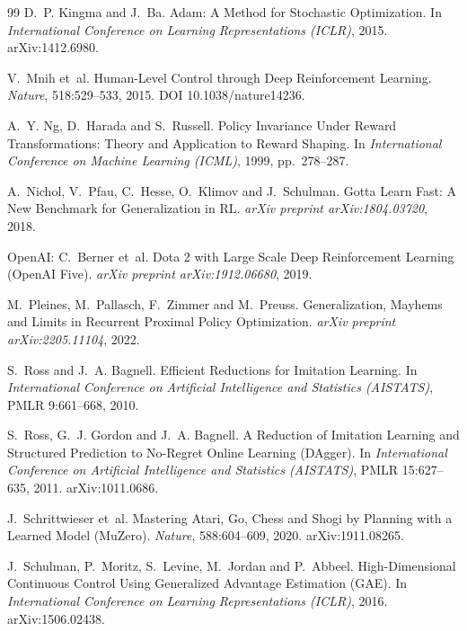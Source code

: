 \documentclass[11pt]{article}
\begin{document}
\begin{thebibliography}{99}
D.~P. Kingma and J.~Ba.
\newblock Adam: A Method for Stochastic Optimization.
\newblock In \emph{International Conference on Learning Representations (ICLR)}, 2015. arXiv:1412.6980.

V.~Mnih et~al.
\newblock Human-Level Control through Deep Reinforcement Learning.
\newblock \emph{Nature}, 518:529--533, 2015. DOI 10.1038/nature14236.

A.~Y. Ng, D.~Harada and S.~Russell.
\newblock Policy Invariance Under Reward Transformations: Theory and Application to Reward Shaping.
\newblock In \emph{International Conference on Machine Learning (ICML)}, 1999, pp.~278--287.

A.~Nichol, V.~Pfau, C.~Hesse, O.~Klimov and J.~Schulman.
\newblock Gotta Learn Fast: A New Benchmark for Generalization in RL.
\newblock \emph{arXiv preprint arXiv:1804.03720}, 2018.

OpenAI: C.~Berner et~al.
\newblock Dota 2 with Large Scale Deep Reinforcement Learning (OpenAI Five).
\newblock \emph{arXiv preprint arXiv:1912.06680}, 2019.

M.~Pleines, M.~Pallasch, F.~Zimmer and M.~Preuss.
\newblock Generalization, Mayhems and Limits in Recurrent Proximal Policy Optimization.
\newblock \emph{arXiv preprint arXiv:2205.11104}, 2022.

S.~Ross and J.~A. Bagnell.
\newblock Efficient Reductions for Imitation Learning.
\newblock In \emph{International Conference on Artificial Intelligence and Statistics (AISTATS)}, PMLR 9:661--668, 2010.

S.~Ross, G.~J. Gordon and J.~A. Bagnell.
\newblock A Reduction of Imitation Learning and Structured Prediction to No-Regret Online Learning (DAgger).
\newblock In \emph{International Conference on Artificial Intelligence and Statistics (AISTATS)}, PMLR 15:627--635, 2011. arXiv:1011.0686.

J.~Schrittwieser et~al.
\newblock Mastering Atari, Go, Chess and Shogi by Planning with a Learned Model (MuZero).
\newblock \emph{Nature}, 588:604--609, 2020. arXiv:1911.08265.

J.~Schulman, P.~Moritz, S.~Levine, M.~Jordan and P.~Abbeel.
\newblock High-Dimensional Continuous Control Using Generalized Advantage Estimation (GAE).
\newblock In \emph{International Conference on Learning Representations (ICLR)}, 2016. arXiv:1506.02438.


\end{thebibliography}
\end{document}
